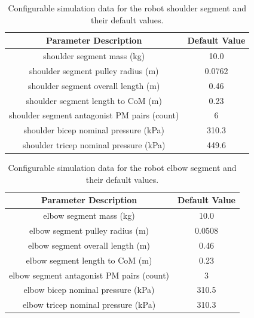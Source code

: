 \documentclass[conference]{IEEEtran}
\begin{document}
	\begin{table}
		\centering
		\begin{tabular}{|c|c|}
			\hline
			\textbf{Parameter Description} & \textbf{Default Value} \\\hline
			shoulder segment mass (kg) & 10.0 \\\hline
			shoulder segment pulley radius (m) & 0.0762 \\\hline
			shoulder segment overall length (m) & 0.46 \\\hline
			shoulder segment length to CoM (m) & 0.23 \\\hline
			shoulder segment antagonist \ac{PM} pairs (count) & 6 \\\hline
			shoulder bicep nominal pressure (kPa) & 310.3 \\\hline
			shoulder tricep nominal pressure (kPa) & 449.6 \\\hline
		\end{tabular}
		\caption{Configurable simulation data for the robot shoulder segment and their default values.}
		\label{table:shoulder-segment-sim-parameters}
	\end{table}

	\begin{table}
		\centering
		\begin{tabular}{|c|c|}
			\hline
			\textbf{Parameter Description} & \textbf{Default Value} \\\hline
			elbow segment mass (kg) & 10.0 \\\hline
			elbow segment pulley radius (m) & 0.0508 \\\hline
			elbow segment overall length (m) & 0.46 \\\hline
			elbow segment length to CoM (m) & 0.23 \\\hline
			elbow segment antagonist \ac{PM} pairs (count) & 3 \\\hline
			elbow bicep nominal pressure (kPa) & 310.5 \\\hline
			elbow tricep nominal pressure (kPa) & 310.3 \\\hline
		\end{tabular}
		\caption{Configurable simulation data for the robot elbow segment and their default values.}
		\label{table:elbow-segment-sim-parameters}
	\end{table}
\end{document}

